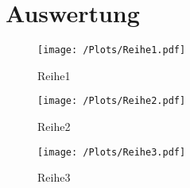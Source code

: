 \section{Auswertung}
\label{sec:Auswertung}

\begin{figure}
  \centering
  \texttt{[image: /Plots/Reihe1.pdf]}
  \caption{Reihe1}
  \label{fig:Reihe1}
\end{figure}

\begin{figure}
  \centering
  \texttt{[image: /Plots/Reihe2.pdf]}
  \caption{Reihe2}
  \label{fig:Reihe2}
\end{figure}

\begin{figure}
  \centering
  \texttt{[image: /Plots/Reihe3.pdf]}
  \caption{Reihe3}
  \label{fig:Reihe3}
\end{figure}

